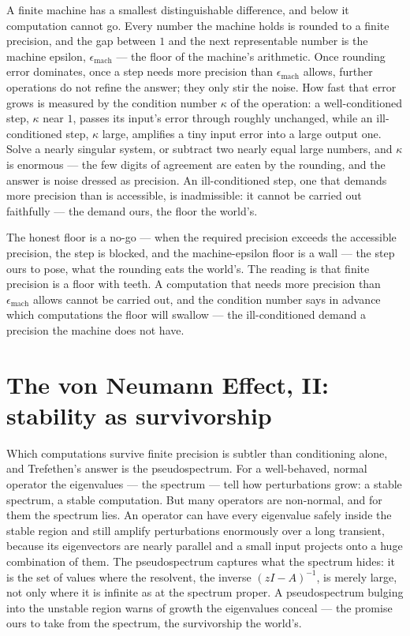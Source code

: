 A finite machine has a smallest distinguishable difference, and below it computation cannot go. Every number
the machine holds is rounded to a finite precision, and the gap between $1$ and the next representable number is
the machine epsilon, $\epsilon_{\text{mach}}$ --- the floor of the machine's arithmetic. Once rounding error
dominates, once a step needs more precision than $\epsilon_{\text{mach}}$ allows, further operations do not
refine
the answer; they only stir the noise. How fast that error grows is measured by the condition number $\kappa$
of the operation: a well-conditioned step, $\kappa$ near $1$, passes its input's error through roughly
unchanged, while an ill-conditioned step, $\kappa$ large, amplifies a tiny input error into a large output one.
Solve a nearly singular system, or subtract two nearly equal large numbers, and $\kappa$ is enormous --- the
few digits of agreement are eaten by the rounding, and the answer is noise dressed as precision. An
ill-conditioned step, one that demands more precision than is accessible, is inadmissible: it cannot be carried
out faithfully --- the demand ours, the floor the world's.

The honest floor is a no-go --- when the required precision exceeds the accessible precision, the step is
blocked, and the machine-epsilon floor is a wall --- the step ours to pose, what the rounding eats the
world's. The reading is that finite precision is a floor with teeth. A
computation that needs more precision than $\epsilon_{\text{mach}}$ allows cannot be carried out, and the
condition number says in advance which computations the floor will swallow --- the ill-conditioned demand a
precision the machine does not have.

\section{The von Neumann Effect, II: stability as survivorship}
\label{se:von-neumann-stability}

Which computations survive finite precision is subtler than conditioning alone, and Trefethen's answer is the
pseudospectrum. For a well-behaved, normal operator the eigenvalues --- the spectrum --- tell how perturbations
grow: a stable spectrum, a stable computation. But many operators are non-normal, and for them the spectrum
lies. An operator can have every eigenvalue safely inside the stable region and still amplify perturbations
enormously over a long transient, because its eigenvectors are nearly parallel and a small input projects onto
a huge combination of them. The pseudospectrum captures what the spectrum hides: it is the set of values where
the resolvent, the inverse $(zI - A)^{-1}$, is merely large, not only where it is infinite as at the spectrum
proper. A pseudospectrum bulging into the unstable region warns of growth the eigenvalues conceal --- the
promise ours to take from the spectrum, the survivorship the world's.


